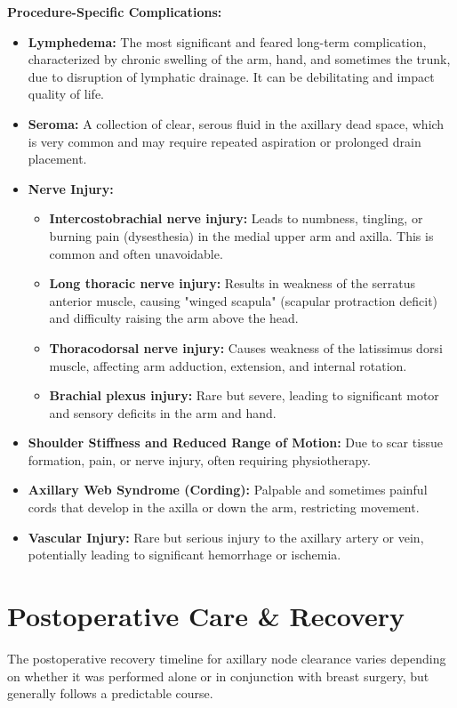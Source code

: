 \textbf{Procedure-Specific Complications:}
\begin{itemize}
  \item \textbf{Lymphedema:} The most significant and feared long-term complication, characterized by chronic swelling of the arm, hand, and sometimes the trunk, due to disruption of lymphatic drainage. It can be debilitating and impact quality of life.
  \item \textbf{Seroma:} A collection of clear, serous fluid in the axillary dead space, which is very common and may require repeated aspiration or prolonged drain placement.
  \item \textbf{Nerve Injury:}
    \begin{itemize}
      \item \textbf{Intercostobrachial nerve injury:} Leads to numbness, tingling, or burning pain (dysesthesia) in the medial upper arm and axilla. This is common and often unavoidable.
      \item \textbf{Long thoracic nerve injury:} Results in weakness of the serratus anterior muscle, causing "winged scapula" (scapular protraction deficit) and difficulty raising the arm above the head.
      \item \textbf{Thoracodorsal nerve injury:} Causes weakness of the latissimus dorsi muscle, affecting arm adduction, extension, and internal rotation.
      \item \textbf{Brachial plexus injury:} Rare but severe, leading to significant motor and sensory deficits in the arm and hand.
    \end{itemize}
  \item \textbf{Shoulder Stiffness and Reduced Range of Motion:} Due to scar tissue formation, pain, or nerve injury, often requiring physiotherapy.
  \item \textbf{Axillary Web Syndrome (Cording):} Palpable and sometimes painful cords that develop in the axilla or down the arm, restricting movement.
  \item \textbf{Vascular Injury:} Rare but serious injury to the axillary artery or vein, potentially leading to significant hemorrhage or ischemia.
\end{itemize}

\section*{Postoperative Care \& Recovery}
The postoperative recovery timeline for axillary node clearance varies depending on whether it was performed alone or in conjunction with breast surgery, but generally follows a predictable course.

